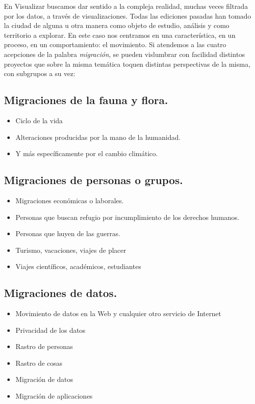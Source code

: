 \documentclass[11pt]{article}
\begin{document}
En Visualizar buscamos dar sentido a la compleja realidad, muchas veces filtrada por los datos, a través de visualizaciones. Todas las ediciones pasadas han tomado la ciudad de alguna u otra manera como objeto de estudio, análisis y como territorio a explorar. En este caso nos centramos en una característica, en un proceso, en un comportamiento: el movimiento. Si atendemos a las cuatro acepciones de la palabra \emph{migración}, se pueden vislumbrar con facilidad distintos proyectos que sobre la misma temática toquen distintas perspectivas de la misma, con subgrupos a su vez:

\subsection*{Migraciones de la fauna y flora.}
\label{sec-3-1}
\begin{itemize}
\item Ciclo de la vida
\item Alteraciones producidas por la mano de la humanidad.
\item Y más específicamente por el cambio climático.
\end{itemize}

\subsection*{Migraciones de personas o grupos.}
\label{sec-3-2}
\begin{itemize}
\item Migraciones económicas o laborales.
\item Personas que buscan refugio por incumplimiento de los derechos humanos.
\item Personas que huyen de las guerras.
\item Turismo, vacaciones, viajes de placer
\item Viajes científicos, académicos, estudiantes
\end{itemize}

\subsection*{Migraciones de datos.}
\label{sec-3-3}
\begin{itemize}
\item Movimiento de datos en la Web y cualquier otro servicio de Internet
\item Privacidad de los datos
\item Rastro de personas
\item Rastro de cosas
\item Migración de datos
\item Migración de aplicaciones
\end{itemize}
\end{document}
